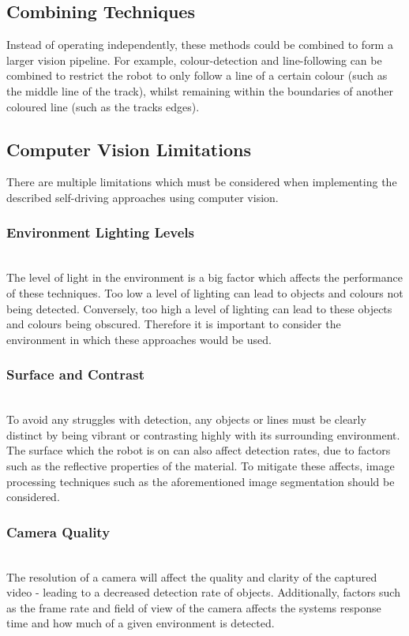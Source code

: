 \documentclass{l4proj}
\begin{document}
\subsection{Combining Techniques}
Instead of operating independently, these methods could be combined to form a larger vision pipeline. For example, colour-detection and line-following can be combined to restrict the robot to only follow a line of a certain colour (such as the middle line of the track), whilst remaining within the boundaries of another coloured line (such as the tracks edges).


\subsection{Computer Vision Limitations}
There are multiple limitations which must be considered when implementing the described self-driving approaches using computer vision.

\subsubsection{Environment Lighting Levels} \hfill \\
The level of light in the environment is a big factor which affects the performance of these techniques. Too low a level of lighting can lead to objects and colours not being detected. Conversely, too high a level of lighting can lead to these objects and colours being obscured. Therefore it is important to consider the environment in which these approaches would be used.

\subsubsection{Surface and Contrast} \hfill \\
To avoid any struggles with detection, any objects or lines must be clearly distinct by being vibrant or contrasting highly with its surrounding environment. The surface which the robot is on can also affect detection rates, due to factors such as the reflective properties of the material. To mitigate these affects, image processing techniques such as the aforementioned image segmentation should be considered.

\subsubsection{Camera Quality} \hfill \\
The resolution of a camera will affect the quality and clarity of the captured video - leading to a decreased detection rate of objects. Additionally, factors such as the frame rate and field of view of the camera affects the systems response time and how much of a given environment is detected.
\end{document}
